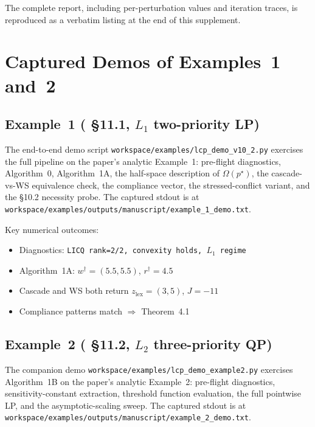 \documentclass[journal, twocolumn]{IEEEtran}
\begin{document}
The complete report, including per-perturbation values and iteration traces, is reproduced as a verbatim listing at the end of this supplement.

\section{Captured Demos of Examples~1 and~2}

\subsection*{Example~1 (\cite{lcp2025} \S11.1, $L_1$ two-priority LP)}

The end-to-end demo script \texttt{workspace/examples/lcp\_demo\_v10\_2.py} exercises the full pipeline on the paper's analytic Example~1: pre-flight diagnostics, Algorithm~0, Algorithm~1A, the half-space description of $\Omega(p^\star)$, the cascade-vs-WS equivalence check, the compliance vector, the stressed-conflict variant, and the \S10.2 necessity probe. The captured stdout is at \texttt{workspace/examples/outputs/manuscript/example\_1\_demo.txt}.

Key numerical outcomes:
\begin{itemize}[leftmargin=*,noitemsep]
\item Diagnostics: \texttt{LICQ rank=2/2, convexity holds, $L_1$ regime} \checkmark
\item Algorithm~1A: $w^\dagger = (5.5, 5.5)$, $r^\dagger = 4.5$ \checkmark
\item Cascade and WS both return $z_{\mathrm{lex}} = (3, 5)$, $J = -11$ \checkmark
\item Compliance patterns match $\Rightarrow$ Theorem~4.1 \checkmark
\end{itemize}

\subsection*{Example~2 (\cite{lcp2025} \S11.2, $L_2$ three-priority QP)}

The companion demo \texttt{workspace/examples/lcp\_demo\_example2.py} exercises Algorithm~1B on the paper's analytic Example~2: pre-flight diagnostics, sensitivity-constant extraction, threshold function evaluation, the full pointwise LP, and the asymptotic-scaling sweep. The captured stdout is at \texttt{workspace/examples/outputs/manuscript/example\_2\_demo.txt}.
\end{document}
